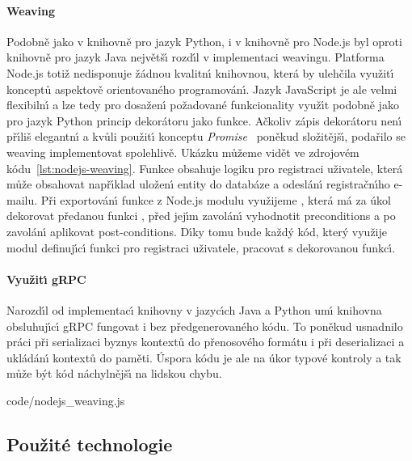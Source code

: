 \paragraph{Weaving} Podobně jako v knihovně pro jazyk Python,
i v knihovně pro Node.js byl oproti knihovně pro jazyk Java
největš\'{\i} rozd\'{\i}l v implementaci weavingu. Platforma Node.js
totiž nedisponuje žádnou kvalitn\'{\i} knihovnou, která by ulehčila
využit\'{\i} konceptů aspektově orientovaného programován\'{\i}.
Jazyk JavaScript je ale velmi flexibiln\'{\i} a lze
tedy pro dosažen\'{\i} požadované funkcionality využ\'{\i}t
podobně jako pro jazyk Python princip dekorátoru jako funkce.
Ačkoliv zápis dekorátoru nen\'{\i} př\'{\i}liš elegantn\'{\i} a kvůli
použit\'{\i} konceptu \textit{Promise}~\cite{kambona2013evaluation}
poněkud složitějš\'{\i}, podařilo se weaving implementovat spolehlivě.
Ukázku můžeme vidět ve zdrojovém kódu~\ref{lst:nodejs-weaving}.
Funkce  obsahuje logiku pro registraci uživatele,
která může obsahovat např\'{\i}klad uložen\'{\i} entity do databáze a odeslán\'{\i}
registračn\'{\i}ho e-mailu. Při exportován\'{\i} funkce z Node.js modulu
využijeme , která má za úkol dekorovat
předanou funkci , před jej\'{\i}m zavolán\'{\i} vyhodnotit
preconditions a po zavolán\'{\i} aplikovat post-conditions.
D\'{\i}ky tomu bude každ\'y kód, kter\'y využije modul definuj\'{\i}c\'{\i} funkci
pro registraci uživatele, pracovat s dekorovanou funkc\'{\i}.

\paragraph{Využit\'{\i} gRPC} Narozd\'{\i}l od implementac\'{\i} knihovny
v jazyc\'{\i}ch Java a Python um\'{\i} knihovna obsluhuj\'{\i}c\'{\i} gRPC
fungovat i bez předgenerovaného kódu. To poněkud usnadnilo
práci při serializaci byznys kontextů do přenosového formátu
i při deserializaci a ukládán\'{\i} kontextů do paměti. Úspora
kódu je ale na úkor typové kontroly a tak může b\'yt kód náchylnějš\'{\i}
na lidskou chybu.


{code/nodejs_weaving.js}

\subsection{Použité technologie}

